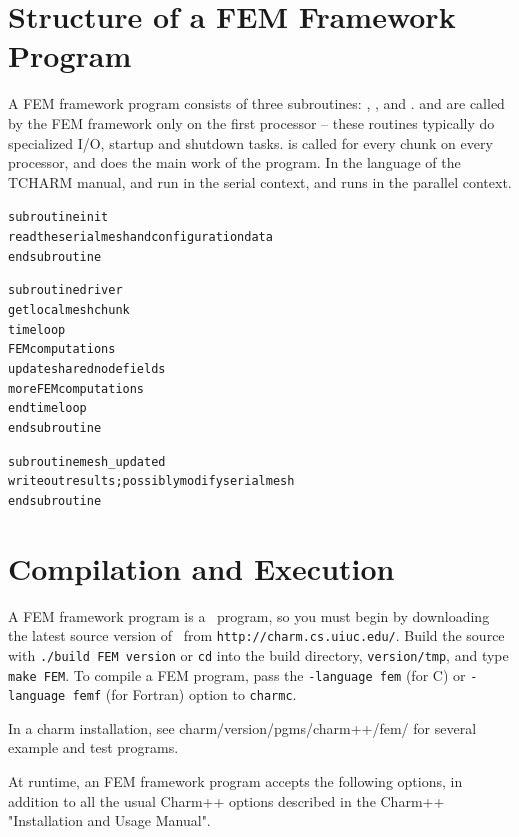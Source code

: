 \documentclass[10pt]{article}
\begin{document}
\section{Structure of a FEM Framework Program}

A FEM framework program consists of three subroutines: , ,
and .   and  are called by the FEM framework
only on the first processor -- these routines typically do specialized I/O,
startup and shutdown tasks.   is called for every chunk on every
processor, and does the main work of the program.  In the language of the
TCHARM manual,  and  run in the serial context, 
and  runs in the parallel context.


\begin{alltt}
     subroutine init
          read the serial mesh and configuration data
     end subroutine

     subroutine driver
          get local mesh chunk
          time loop
               FEM computations
               update shared node fields
               more FEM computations
          end time loop
     end subroutine

     subroutine mesh_updated
          write out results; possibly modify serial mesh
     end subroutine
\end{alltt}

\section{Compilation and Execution}

A FEM framework program is a \charmpp\ program, so you must begin by
downloading the latest source version of \charmpp\ from
{\tt http://charm.cs.uiuc.edu/}.  Build the source with 
{\tt ./build FEM version} or {\tt cd} into the build directory, 
{\tt version/tmp}, and type {\tt make FEM}.
To compile a FEM program, pass the {\tt -language fem} (for C) or 
{\tt -language femf} (for Fortran) option to {\tt charmc}.

In a charm installation, see charm/version/pgms/charm++/fem/
for several example and test programs.

At runtime, an FEM framework program accepts the following
options, in addition to all the usual Charm++ options described in 
the Charm++ "Installation and Usage Manual".
\end{document}
